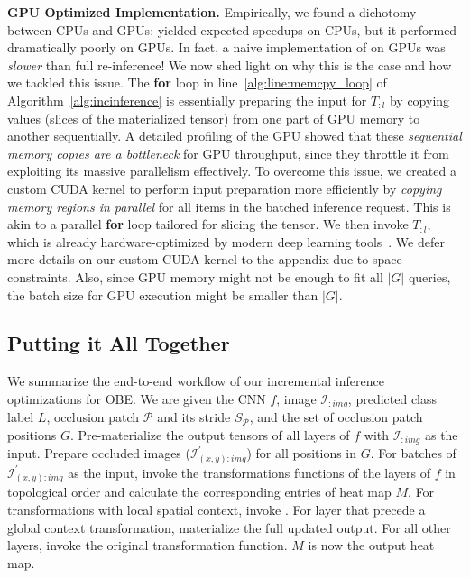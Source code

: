 \vspace{2mm}
\noindent \textbf{GPU Optimized Implementation.}
Empirically, we found a dichotomy between CPUs and GPUs:  yielded expected speedups on CPUs, but it performed dramatically poorly on GPUs. In fact, a naive implementation of  on GPUs was \textit{slower} than full re-inference! We now shed light on why this is the case and how we tackled this issue. The \textbf{for} loop in line~\ref{alg:line:memcpy_loop} of Algorithm~\ref{alg:incinference} is essentially preparing the input for $T_{:l}$ by copying values (slices of the materialized tensor) from one part of GPU memory to another sequentially. A detailed profiling of the GPU showed that these \textit{sequential memory copies are a bottleneck} for GPU throughput, since they throttle it from exploiting its massive parallelism effectively. To overcome this issue, we created a custom CUDA kernel to perform input preparation more efficiently by \textit{copying memory regions in parallel} for all items in the batched inference request. This is akin to a parallel \textbf{for} loop tailored for slicing the tensor. We then invoke $T_{:l}$, which is already hardware-optimized by modern deep learning tools~\cite{chetlur2014cudnn}. We defer more details on our custom CUDA kernel to the appendix due to space constraints. Also, since GPU memory might not be enough to fit all $|G|$ queries, the batch size for GPU execution might be smaller than $|G|$.


\vspace{-2mm}
\subsection{Putting it All Together}

We summarize the end-to-end workflow of our incremental inference optimizations for OBE. We are given the CNN $f$, image $\mathcal{I}_{:\mathit{img}}$, predicted class label $L$, occlusion patch $\mathcal{P}$ and its stride $S_{\mathcal{P}}$, and the set of occlusion patch positions $G$. Pre-materialize the output tensors of all layers of $f$ with $\mathcal{I}_{:\mathit{img}}$ as the input. Prepare occluded images ($\mathcal{I}^{'}_{(x,y):\mathit{img}}$) for all positions in $G$. For batches of $\mathcal{I}^{'}_{(x,y):\mathit{img}}$ as the input, invoke the transformations functions of the layers of $f$ in topological order and calculate the corresponding entries of heat map $M$. 
For transformations with local spatial context, invoke . For layer that precede a global context transformation, materialize the full updated output. For all other layers, invoke the original transformation function. $M$ is now the output heat map.


